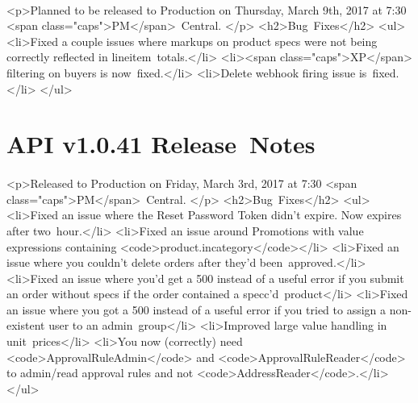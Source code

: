 \documentclass{memoir}%
\begin{document}
%
\paragraph*{}%
<p>Planned to be released to Production on Thursday, March 9th, 2017 at 7:30 <span class="caps">PM</span>~Central. </p>\newline%
<h2>Bug~Fixes</h2>\newline%
<ul>\newline%
<li>Fixed a couple issues where markups on product specs were not being correctly reflected in lineitem~totals.</li>\newline%
<li><span class="caps">XP</span> filtering on buyers is now~fixed.</li>\newline%
<li>Delete webhook firing issue is~fixed.</li>\newline%
</ul>

%
\section*{API v1.0.41 Release~Notes}%
\paragraph*{}%

%
\paragraph*{}%
<p>Released to Production on Friday, March 3rd, 2017 at 7:30 <span class="caps">PM</span>~Central. </p>\newline%
<h2>Bug~Fixes</h2>\newline%
<ul>\newline%
<li>Fixed an issue where the Reset Password Token didn’t expire. Now expires after two~hour.</li>\newline%
<li>Fixed an issue around Promotions with value expressions containing <code>product.incategory</code></li>\newline%
<li>Fixed an issue where you couldn’t delete orders after they’d been~approved.</li>\newline%
<li>Fixed an issue where you’d get a 500 instead of a useful error if you submit an order without specs if the order contained a specc’d~product</li>\newline%
<li>Fixed an issue where you got a 500 instead of a useful error if you tried to assign a non{-}existent user to an admin~group</li>\newline%
<li>Improved large value handling in unit~prices</li>\newline%
<li>You now (correctly) need <code>ApprovalRuleAdmin</code> and <code>ApprovalRuleReader</code> to admin/read approval rules and not <code>AddressReader</code>.</li>\newline%
</ul>
\end{document}
